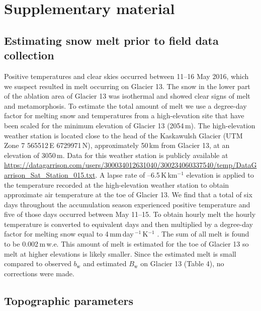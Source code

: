 \documentclass[onecolumn, letterpaper]{igs}
\begin{document}
\title[Estimating winter balance and its uncertainty]{}
\author[Pulwicki and others, 2018]{}
  
\section*{Supplementary material}


\subsection*{Estimating snow melt prior to field data collection}

Positive temperatures and clear skies occurred between 11--16 May 2016, which we suspect resulted in melt occurring on Glacier 13. The snow in the lower part of the ablation area of Glacier 13 was isothermal and showed clear signs of melt and metamorphosis. To estimate the total amount of melt we use a degree-day factor for melting snow \citep{Braithwaite2008} and temperatures from a high-elevation site that have been scaled for the minimum elevation of Glacier 13 (2054\,m). The high-elevation weather station is located close to the head of the Kaskawulsh Glacier (UTM Zone 7 565512\,E 6729971\,N), approximately 50\,km from Glacier 13, at an elevation of 3050\,m. Data for this weather station is publicly available at \url{https://datagarrison.com/users/300034012631040/300234060337540/temp/DataGarrison_Sat_Station_015.txt}. A lapse rate of --6.5\,K\,km$^{-1}$ elevation is applied to the temperature recorded at the high-elevation weather station to obtain approximate air temperature at the toe of Glacier 13. We find that a total of six days throughout the accumulation season experienced positive temperature and five of those days occurred between May 11--15. To obtain hourly melt the hourly temperature is converted to equivalent days and then multiplied by a degree-day factor for melting snow equal to 4\,mm\,day\,$^{-1}$\,K$^{-1}$ \citep{Braithwaite2008}. The sum of all melt is found to be 0.002\,m\,w.e. This amount of melt is estimated for the toe of Glacier 13 so melt at higher elevations is likely smaller.  Since the estimated melt is small compared to observed $b_\mathrm{w}$ and estimated $B_\mathrm{w}$ on Glacier 13 (Table 4), no corrections were made. 


\subsection*{Topographic parameters}
\end{document}
